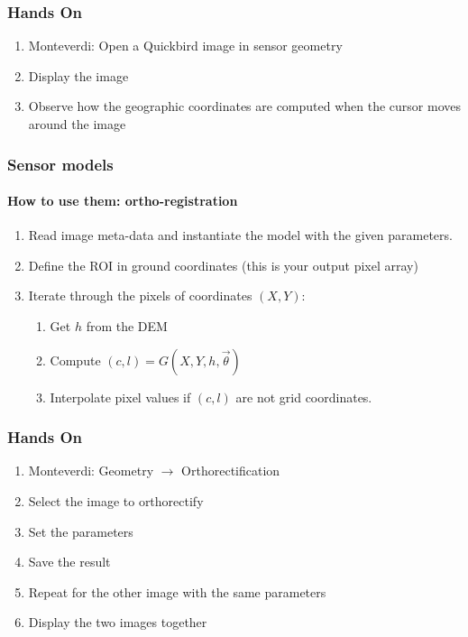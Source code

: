 \documentclass[compress]{beamer}
\begin{document}
\begin{frame}
\frametitle{Hands On}
\begin{enumerate}
\item Monteverdi: Open a Quickbird image in sensor geometry
\item Display the image
\item Observe how the geographic coordinates are computed when the cursor
      moves around the image
\end{enumerate}
\end{frame}

\begin{frame}
  \frametitle{Sensor models}

  \framesubtitle{How to use them: ortho-registration}
  \begin{enumerate}
    \item Read image meta-data and instantiate the model with the
    given parameters.
  \item Define the ROI in ground coordinates (this is your output
  pixel array)
  \item Iterate through the pixels of coordinates $(X,Y)$:
    \begin{enumerate}
      \item Get $h$ from the DEM
      \item Compute $(c,l) = G(X,Y,h,\vec\theta)$
      \item Interpolate pixel values if $(c,l)$ are not grid coordinates.
    \end{enumerate}
  \end{enumerate}
\end{frame}

\begin{frame}
\frametitle{Hands On}
\begin{enumerate}
\item Monteverdi: Geometry $\rightarrow$ Orthorectification
\item Select the image to orthorectify
\item Set the parameters
\item Save the result
\item Repeat for the other image with the same parameters
\item Display the two images together
\end{enumerate}
\end{frame}
\end{document}
